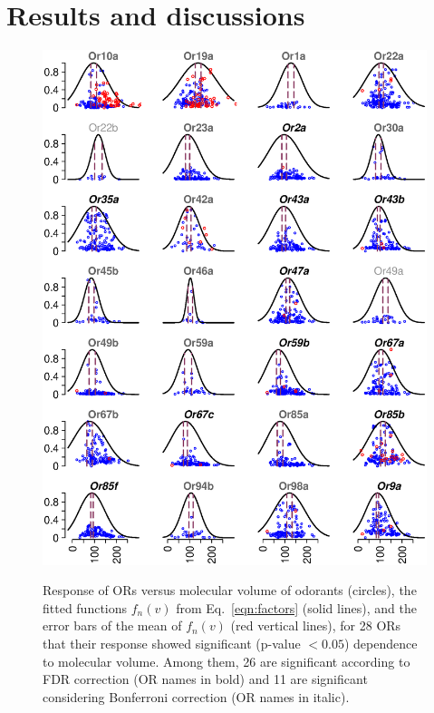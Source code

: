 \documentclass[11pt]{paper} %
\newcommand{\numberofreceptors}{ 28 }
\newcommand{\bonferroni}{ 11 }
\newcommand{\fdr}{ 26 }
\begin{document}

\section*{Results and discussions}
\begin{figure}
	\centering
		\includegraphics[width=0.8 \textwidth]{vol-res-}
		\label{fig:vol-res:all}		
	\caption{Response of ORs  versus molecular volume of odorants (circles),  
			the fitted functions $f_n(v)$ from Eq.~\ref{eqn:factors} (solid lines), 
			and the error bars of the mean of $f_n(v)$ (red vertical lines), 
			for \numberofreceptors ORs that their response showed significant (p-value $<0.05$) dependence to molecular volume. 
			Among them, \fdr are significant according to FDR correction (OR names in bold) and 
			\bonferroni are significant considering Bonferroni correction (OR names in italic).
		}
	\label{fig:vol-res}
\end{figure}
\end{document}
